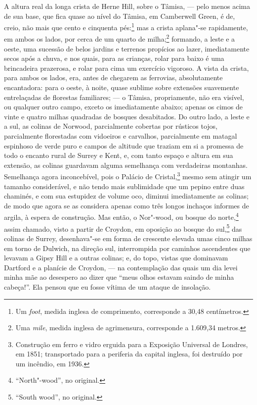 A altura real da longa crista de Herne Hill, sobre o Tâmisa, --- pelo
menos acima de sua base, que fica quase ao nível do Tâmisa, em
Camberwell Green, é de, creio, não mais que cento e cinquenta
pés:\footnote{Um \textit{foot}, medida inglesa de comprimento, corresponde
  a 30,48 centímetros.} mas a crista aplana"-se rapidamente, em
ambos os lados, por cerca de um quarto de milha;\footnote{Uma
  \textit{mile}, medida inglesa de agrimensura, corresponde a 1.609,34 metros.} formando, a leste e a oeste, uma sucessão de belos
jardins e terrenos propícios ao lazer, imediatamente secos após a chuva,
e nos quais, para as crianças, rolar para baixo é uma brincadeira
prazerosa, e rolar para cima um exercício vigoroso. A vista da crista,
para ambos os lados, era, antes de chegarem as ferrovias, absolutamente
encantadora: para o oeste, à noite, quase sublime sobre extensões
suavemente entrelaçadas de florestas familiares; --- o Tâmisa,
propriamente, não era visível, ou qualquer outro campo, exceto os
imediatamente abaixo; apenas os cimos de vinte e quatro milhas quadradas
de bosques desabitados. Do outro lado, a leste e a sul, as colinas de
Norwood, parcialmente cobertas por rústicos tojos, parcialmente
florestadas com vidoeiros e carvalhos, parcialmente em matagal espinhoso
de verde puro e campos de altitude que traziam em si a promessa de todo
o encanto rural de Surrey e Kent, e, com tanto espaço e altura em sua
extensão, as colinas guardavam alguma semelhança com verdadeiras
montanhas. Semelhança agora inconcebível, pois o Palácio de
Cristal,\footnote{Construção em ferro e vidro erguida para a Exposição
  Universal de Londres, em 1851; transportado para a periferia da
  capital inglesa, foi destruído por um incêndio, em 1936.} mesmo sem atingir um tamanho considerável, e não tendo mais
sublimidade que um pepino entre duas chaminés, e com sua estupidez de
volume oco, diminui imediatamente as colinas; de modo que agora se as
considera apenas como três longos inchaços informes de argila, à espera
de construção. Mas então, o Nor"-wood, ou bosque do norte,\footnote{``North"-wood'',
  no original.} assim chamado, visto a partir de
Croydon, em oposição ao bosque do sul,\footnote{``South wood'', no
  original.} das colinas de Surrey, desenhava"-se em
forma de crescente elevada umas cinco milhas em torno de Dulwich, na
direção sul, interrompida por caminhos ascendentes que levavam a Gipsy
Hill e a outras colinas; e, do topo, vistas que dominavam Dartford e a
planície de Croydon, --- na contemplação das quais um dia levei minha mãe
ao desespero ao dizer que ``meus olhos estavam saindo de minha cabeça!''.
Ela pensou que eu fosse vítima de um ataque de insolação.

